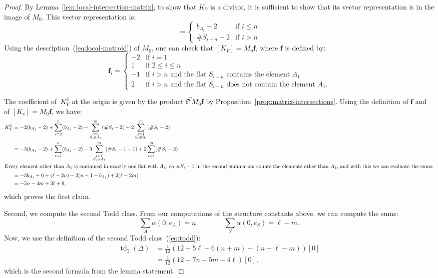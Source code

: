 \documentclass[11pt]{amsart}
\theoremstyle{definition}
\newcommand{\bff}{\mathbf f}
\newcommand{\td}{\operatorname{td}}
\begin{document}
\begin{proof}
By Lemma~\ref{lem:local-intersection-matrix}, to show that $K_V$ is a divisor,
it is sufficient to show that its vector representation is in the image of
$M_0$. This vector representation is:
\begin{equation*}
[K_V] = \begin{cases}
b_{A_i} - 2 & \mbox{if } i \leq n \\
\# S_{i-n} - 2 & \mbox{if } i > n
\end{cases}
\end{equation*}
Using the description~(\ref{eq:local-matroid}) of $M_0$, one can check that
$[K_V] = M_0 \bff$, where $\bff$ is defined by:
\begin{equation*}
\bff_i = \begin{cases}
-2 &\mbox{if $i = 1$} \\
1 & \mbox{if $2 \leq i \leq n$}\\
-1 & \mbox{if $i > n$ and the flat $S_{i-n}$ contains the element $A_1$} \\
2 & \mbox{if $i > n$ and the flat $S_{i-n}$ does not contain the element $A_1$}.
\end{cases}
\end{equation*}

The coefficient of~$K_V^2$ at the origin is given by the product $\bff^T M_0
\bff$ by Proposition~\ref{prop:matrix-intersections}. Using the definition of $\bff$ and of $[K_v] = M_0 \bff$, we
have:
\begin{align*}
K_V^2 &= -2(b_{A_1} - 2) + \sum_{i=2}^n (b_{A_i} - 2)
- \sum_{\substack{i = 1 \\ S_i \ni A_1}}^m (\# S_i - 2 )
+ 2 \sum_{\substack{i = 1 \\ S_i \not\ni A_1}}^m (\# S_i - 2) \\
&= -3(b_{A_1} - 2) + \sum_{i=1}^n (b_{A_i} - 2)
- 3\sum_{\substack{i=1 \\ S_i \ni A_1}}^m (\# S_i - 1 - 1)
+ 2 \sum_{i = 1}^m (\# S_i - 2) \\
\intertext{Every element other than $A_1$ is contained in exactly one flat with
$A_1$, so $\#S_i - 1$ in the second summation counts the elements other than
$A_1$, and with this we can evaluate the sums:}
&= -3b_{A_1} + 6 + (\ell - 2 n) - 3(n - 1 - b_{A_{1}}) + 2 (\ell - 2 m) \\
&= -5n -4m + 3 \ell + 9,
\end{align*}
which proves the first claim.

Second, we compute the second Todd class.
From our computations of the structure constants above, we can compute the sums:
\begin{equation*}
\sum_{A} \alpha(0, e_A) = n   \qquad\qquad
\sum_{S} \alpha(0, e_S) = \ell - m.
\end{equation*}
Now, we use the definition of the second Todd class~(\ref{eq:todd}):
\begin{align*}
\td_2(\Delta) &= {\textstyle\frac{1}{12}}(12 + 5 \ell - 6 (n + m) -
(n + \ell - m))[0] \\
&= {\textstyle\frac{1}{12}}(12 - 7n - 5m - 4\ell )[0],
\end{align*}
which is the second formula from the lemma statement.
\end{proof}
\end{document}
